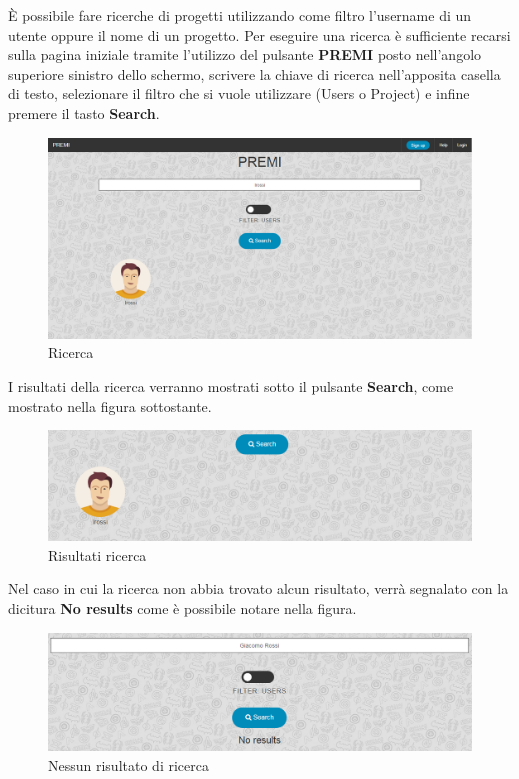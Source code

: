 È possibile fare ricerche di progetti utilizzando come filtro l'username di un utente oppure il nome di un progetto.
\newline
Per eseguire una ricerca è sufficiente recarsi sulla pagina iniziale tramite l'utilizzo del pulsante \textbf{PREMI} posto nell'angolo superiore sinistro dello schermo, scrivere la chiave di ricerca nell'apposita casella di testo, selezionare il filtro che si vuole utilizzare (Users o Project) e infine premere il tasto \textbf{Search}.

\begin{figure}[h] 
	\centering 
	\includegraphics[scale=0.40] {img/ricerca.png}
	\caption{Ricerca} 
\end{figure}


\noindent I risultati della ricerca verranno mostrati sotto il pulsante \textbf{Search}, come mostrato nella figura sottostante.

\begin{figure}[h] 
	\centering 
	\includegraphics[scale=0.40] {img/ricercaris.png}
	\caption{Risultati ricerca} 
\end{figure}

\noindent Nel caso in cui la ricerca non abbia trovato alcun risultato, verrà segnalato con la dicitura \textbf{No results} come è possibile notare nella figura.

\begin{figure}[H] 
	\centering 
	\includegraphics[scale=0.40] {img/noresults.png}
	\caption{Nessun risultato di ricerca} 
\end{figure}